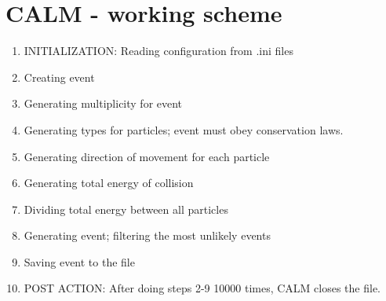 \newpage
\section{CALM - working scheme}
\begin{enumerate}
    \item INITIALIZATION: Reading configuration from .ini files
    \item Creating event
    \item Generating multiplicity for event
    \item Generating types for particles; event must obey conservation laws.
    \item Generating direction of movement for each particle
    \item Generating total energy of collision
    \item Dividing total energy between all particles
    \item Generating event; filtering the most unlikely events
    \item Saving event to the file
    \item POST ACTION: After doing steps 2-9 10000 times, CALM closes the file.
\end{enumerate}